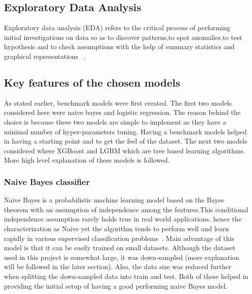 \documentclass[journal,twoside,web]{ieeecolor}
\begin{document}




\subsection{Exploratory Data Analysis}
Exploratory data analysis (EDA) refers to the critical process of performing initial investigations on data so as to discover patterns,to spot anomalies,to test hypothesis and to check assumptions with the help of summary statistics and graphical representations ~\cite{patil_patil_2018}.




\subsection{Key features of the chosen models}
As stated earlier, benchmark models were first created. The first two models considered here were naive bayes and logistic regression. The reason behind the choice is because these two models are simple to implement as they have a minimal number of hyper-parameters tuning. Having a benchmark models helped in having a starting point and to get the feel of the dataset. The next two models considered where XGBoost and LGBM which are tree based learning algorithms. More high level explanation of these models is followed.  
                        
\subsubsection{Naive Bayes classifier}
Naive Bayes is a probabilistic machine learning model based on the Bayes theorem with an assumption of independence among the features.This  conditional independence  assumption  rarely  holds  true  in  real world  applications,  hence  the  characterization  as Naive yet the algorithm tends to perform well and learn  rapidly  in  various  supervised classification problems~\cite{dimitoglou2012comparison}. Main advantage of this model is that it can be easily trained on small datasets. Although the dataset used in this project is somewhat large, it was down-sampled (more explanation will be followed in the later section). Also, the data size was reduced further when splitting the down-sampled data into train and test. Both of these helped in providing the initial setup of having a good performing naive Bayes model. 
\end{document}
